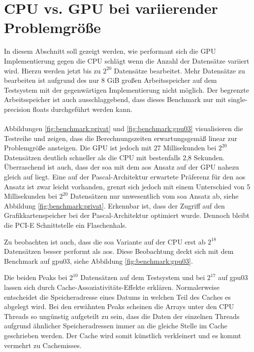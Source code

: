 \section{CPU vs. GPU bei variierender Problemgröße}
In diesem Abschnitt soll gezeigt werden, wie performant sich die GPU Implementierung gegen die CPU schlägt wenn die Anzahl der Datensätze variiert wird. Hierzu werden jetzt bis zu $2^{20}$ Datensätze bearbeitet.
Mehr Datensätze zu bearbeiten ist aufgrund des nur 8 GiB großen Arbeitsspeicher auf dem Testsystem mit der gegenwärtigen Implementierung nicht möglich. Der begrenzte Arbeitsspeicher ist auch ausschlaggebend, dass dieses Benchmark nur mit single-precision floats durchgeführt werden kann.
\\\\
Abbildungen \ref{fig:benchmark:privat} und \ref{fig:benchmark:gpu03} visualisieren die Testreihe und zeigen, dass die Berechnungszeiten erwartungsgemäß linear zur Problemgröße ansteigen. Die GPU ist jedoch mit 27 Millisekunden bei $2^{20}$ Datensätzen deutlich schneller als die CPU mit bestenfalls 2,8 Sekunden. Überraschend ist auch, dass der \gls{soa} mit dem \gls{aos} Ansatz auf der GPU nahezu gleich auf liegt. Eine auf der Pascal-Architektur erwartete Präferenz für den \gls{aos} Ansatz ist zwar leicht vorhanden, grenzt sich jedoch mit einem Unterschied von 5 Millisekunden bei $2^{20}$ Datensätzen nur unwesentlich vom \gls{soa} Ansatz ab, siehe Abbildung \ref{fig:benchmark:privat}.
Erkennbar ist, dass der Zugriff auf den Grafikkartenspeicher bei der Pascal-Architektur optimiert wurde. Dennoch bleibt die PCI-E Schnittstelle ein Flaschenhals.

Zu beobachten ist auch, dass die \gls{soa} Variante auf der CPU erst ab $2^{18}$ Datensätzen besser performt als \gls{aos}. Diese Beobachtung deckt sich mit dem Benchmark auf gpu03, siehe Abbildung \ref{fig:benchmark:gpu03}.

Die beiden Peaks bei $2^{10}$ Datensätzen auf dem Testsystem und bei $2^{17}$ auf gpu03 lassen sich durch Cache-Assoziativitäts-Effekte erklären. Normalerweise entscheidet die Speicheradresse eines Datums in welchen Teil des Caches es abgelegt wird. Bei den erwähnten Peaks scheinen die Arrays unter den CPU Threads so ungünstig aufgeteilt zu sein, dass die Daten der einzelnen Threads aufgrund ähnlicher Speicheradressen immer an die gleiche Stelle im Cache geschrieben werden. Der Cache wird somit künstlich verkleinert und es kommt vermehrt zu Cachemisses.



